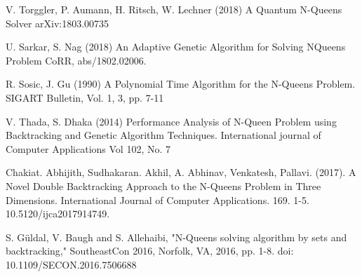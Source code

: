 \documentclass[conference]{IEEEtran}
\begin{document}
\begin{thebibliography}{99.}
 V. Torggler, P. Aumann, H. Ritsch, W. Lechner (2018) A Quantum N-Queens Solver arXiv:1803.00735 

 U. Sarkar, S. Nag (2018) An Adaptive Genetic Algorithm for Solving NQueens Problem CoRR, abs/1802.02006.

 R. Sosic, J. Gu (1990) A Polynomial Time Algorithm for the N-Queens Problem. SIGART Bulletin, Vol. 1, 3, pp. 7-11

 V. Thada, S. Dhaka (2014) Performance Analysis of N-Queen Problem using Backtracking and Genetic Algorithm Techniques. International journal of Computer Applications Vol 102, No. 7

 Chakiat. Abhijith, Sudhakaran. Akhil, A. Abhinav, Venkatesh, Pallavi. (2017). A Novel Double Backtracking Approach to the N-Queens Problem in Three Dimensions. International Journal of Computer Applications. 169. 1-5. 10.5120/ijca2017914749. 

 S. Güldal, V. Baugh and S. Allehaibi, "N-Queens solving algorithm by sets and backtracking," SoutheastCon 2016, Norfolk, VA, 2016, pp. 1-8.
doi: 10.1109/SECON.2016.7506688


\end{thebibliography}
\end{document}
